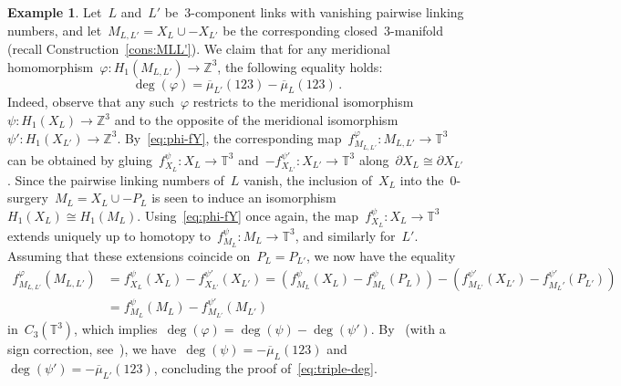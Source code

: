 \documentclass[10.9pt,a4paper]{amsart}
\theoremstyle{definition}
\newtheorem{example}[theorem]{Example}
\theoremstyle{remark}
\newcommand{\Z}{\mathbb{Z}}
\begin{document}
\begin{example}\label{ex:triple-deg}
Let~$L$ and~$L'$ be~$3$-component links with vanishing pairwise linking numbers, and let~$M_{L,L'}=X_L\cup - X_{L'}$ be the corresponding closed~$3$-manifold (recall Construction~\ref{cons:MLL'}). We claim that for any meridional
homomorphism~$\varphi\colon H_1(M_{L,L'})\to\Z^3$, the following equality holds:
\begin{equation}
\label{eq:triple-deg}
\deg(\varphi)=\overline{\mu}_{L'}(123)-\overline{\mu}_{L}(123)\,.
\end{equation}
Indeed, observe that any such~$\varphi$ restricts to the meridional isomorphism~$\psi\colon H_1(X_L)\to\Z^3$ and to the opposite of the meridional isomorphism~$\psi'\colon H_1(X_{L'})\to\Z^3$. By~\eqref{eq:phi-fY}, the corresponding map~$f^\varphi_{M_{L,L'}}\colon M_{L,L'}\to\mathbb{T}^3$ can be obtained by gluing~$f^\psi_{X_L}\colon X_L\to\mathbb{T}^3$ and~$-f^{\psi'}_{X_{L'}}\colon X_{L'}\to\mathbb{T}^3$ along~$\partial X_L\cong\partial X_{L'}$. Since the pairwise linking numbers of~$L$ vanish, the inclusion of~$X_L$ into the~$0$-surgery~$M_L=X_L\cup -P_L$ is seen to induce an isomorphism~$H_1(X_L)\cong H_1(M_L)$. Using~\eqref{eq:phi-fY} once again, the map~$f^\psi_{X_L}\colon X_L\to\mathbb{T}^3$ extends uniquely up to homotopy to~$f^\psi_{M_L}\colon M_L\to\mathbb{T}^3$, and similarly for~$L'$. 
Assuming that these extensions coincide on~$P_L=P_{L'}$,
we now have the equality
\begin{align*}
f^\varphi_{M_{L,L'}}(M_{L,L'})&=f^\psi_{X_{L}}(X_L)-f^{\psi'}_{X_{L'}}(X_{L'})
=(f^\psi_{M_{L}}(X_L)-f^\psi_{M_L}(P_L))-(f^{\psi'}_{M_{L'}}(X_{L'})-f^{\psi'}_{M_L'}(P_{L'}))\\
&=f^\psi_{M_{L}}(M_L)-f^{\psi'}_{M_{L'}}(M_{L'})
\end{align*}
in~$C_3(\mathbb{T}^3)$, which implies~$\deg(\varphi)=\deg(\psi)-\deg(\psi')$.
By~\cite[Section~4]{PP22} (with a sign correction, see~\cite{M-M}),  we have~$\deg(\psi)=-\overline{\mu}_L(123)$ and~$\deg(\psi')=-\overline{\mu}_{L'}(123)$, concluding the proof of~\eqref{eq:triple-deg}.
\end{example}
\end{document}
